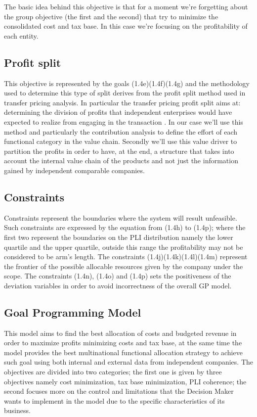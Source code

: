 \begin{doublespace}
The basic idea behind this objective is that for a moment we're forgetting about the group objective (the first and the second) that try to minimize the consolidated cost and tax base. In this case we're focusing on the profitability of each entity.

\subsection{Profit split}
This objective is represented by the goals (1.4e)(1.4f)(1.4g) and the methodology used to determine this type of split derives from the profit split method used in transfer pricing analysis. In particular the transfer pricing profit split aims at: determining the division of profits that independent enterprises would have expected to realize from engaging in the transaction \cite{OECD_ProfitSplit_2017}. In our case we'll use this method and particularly the contribution analysis to define the effort of each functional category in the value chain. Secondly we'll use this value driver to partition the profits in order to have, at the end, a structure that takes into account the internal value chain of the products and not just the information gained by independent comparable companies.


\subsection{Constraints}
Constraints represent the boundaries where the system will result unfeasible. Such constraints are expressed by the equation from (1.4h) to (1.4p); where the first two represent the boundaries on the PLI distribution namely the lower quartile and the upper quartile, outside this range the profitability may not be considered to be arm's length. The constraints (1.4j)(1.4k)(1.4l)(1.4m) represent the frontier of the possible allocable resources given by the company under the scope. The constraints (1.4n), (1.4o) and (1.4p) sets the positiveness of the deviation variables in order to avoid incorrectness of the overall GP model.

\subsection{Goal Programming Model}

This model aims to find the best allocation of costs and budgeted revenue in order to maximize profits minimizing costs and tax base, at the same time the model provides the best multinational functional allocation strategy to achieve such goal using both internal and external data from independent companies.
The objectives are divided into two categories; the first one is given by three objectives namely cost minimization, tax base minimization, PLI coherence; the second focuses more on the control and limitations that the Decision Maker wants to implement in the model due to the specific characteristics of its business.


\end{doublespace}
